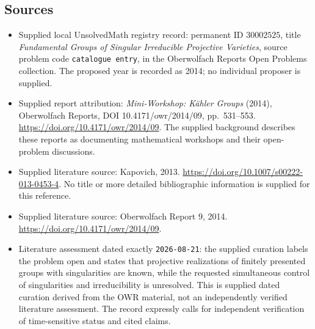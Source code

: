 \documentclass[11pt]{article}
\begin{document}
\subsection{Sources}
\begin{itemize}
\item Supplied local UnsolvedMath registry record: permanent ID $30002525$, title \emph{Fundamental Groups of Singular Irreducible Projective Varieties}, source problem code \texttt{catalogue entry}, in the Oberwolfach Reports Open Problems collection. The proposed year is recorded as 2014; no individual proposer is supplied.
\item Supplied report attribution: \emph{Mini-Workshop: Kähler Groups} (2014), Oberwolfach Reports, DOI 10.4171/owr/2014/09, pp.\ 531--553. \url{https://doi.org/10.4171/owr/2014/09}. The supplied background describes these reports as documenting mathematical workshops and their open-problem discussions.
\item Supplied literature source: Kapovich, 2013. \url{https://doi.org/10.1007/s00222-013-0453-4}. No title or more detailed bibliographic information is supplied for this reference.
\item Supplied literature source: Oberwolfach Report 9, 2014. \url{https://doi.org/10.4171/owr/2014/09}.
\item Literature assessment dated exactly \texttt{2026-08-21}: the supplied curation labels the problem open and states that projective realizations of finitely presented groups with singularities are known, while the requested simultaneous control of singularities and irreducibility is unresolved. This is supplied dated curation derived from the OWR material, not an independently verified literature assessment. The record expressly calls for independent verification of time-sensitive status and cited claims.
\end{itemize}
\end{document}
